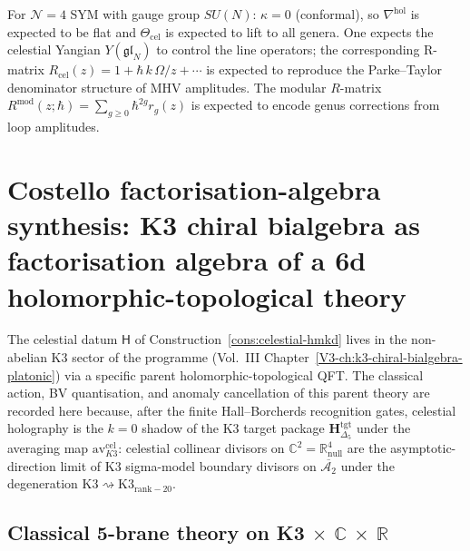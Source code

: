 \begin{conjecture}[Celestial holographic datum for
$\mathcal N=4$ SYM; \ClaimStatusConjectured]
For $\mathcal N=4$ SYM with gauge group $SU(N)$:
$\kappa=0$ (conformal), so
$\nabla^{\mathrm{hol}}$ is expected to be flat and
$\Theta_{\mathrm{cel}}$ is expected to lift to all genera. One
expects the celestial Yangian $Y(\mathfrak{gl}_N)$ to control the line
operators; the corresponding R-matrix
$R_{\mathrm{cel}}(z)=1+\hbar\,k\,\Omega/z+\cdots$ is expected to reproduce the
Parke--Taylor denominator structure of MHV amplitudes.
The modular $R$-matrix
$R^{\mathrm{mod}}(z;\hbar)=\sum_{g\ge 0}\hbar^{2g}r_g(z)$
is expected to encode genus corrections from loop amplitudes.
\end{conjecture}

\section{Costello factorisation-algebra synthesis: K3 chiral bialgebra as factorisation algebra of a 6d holomorphic-topological theory}
\label{sec:costello-k3-dna}

The celestial datum $\mathsf{H}$ of Construction~\ref{cons:celestial-hmkd}
lives in the non-abelian K3 sector of the programme (Vol.~III
Chapter~\ref{V3-ch:k3-chiral-bialgebra-platonic}) via a
specific parent holomorphic-topological QFT. The classical action,
BV quantisation, and anomaly cancellation of this parent theory are
recorded here
because, after the finite Hall--Borcherds recognition gates, celestial
holography is the $k=0$ shadow of the K3 target package
$\mathbf{H}_{\Delta_5}^{\mathrm{tgt}}$ under the averaging map
$\mathrm{av}^{\mathrm{cel}}_{K3}$: celestial collinear divisors on
$\mathbb{C}^2 = \mathbb{R}^4_{\mathrm{null}}$ are the
asymptotic-direction limit of K3 sigma-model boundary
divisors on $\overline{\mathcal{A}_2}$ under the degeneration
$\mathrm{K3} \rightsquigarrow \mathrm{K3}_{\mathrm{rank-20}}$.

\subsection{Classical 5-brane theory on K3 $\times$ $\mathbb{C}$ $\times$ $\mathbb{R}$}
\label{subsec:costello-classical-action}

